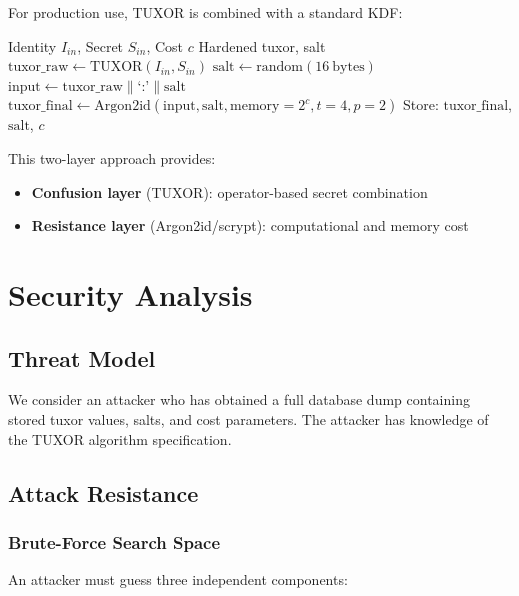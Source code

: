 \documentclass[11pt,a4paper]{article}
\begin{document}
For production use, TUXOR is combined with a standard KDF:

\begin{algorithm}
\caption{TUXOR Secure Mode}
\label{alg:secure}
\begin{algorithmic}[1]
\Require Identity $I_{in}$, Secret $S_{in}$, Cost $c$
\Ensure Hardened tuxor, salt
\State $\text{tuxor\_raw} \gets \text{TUXOR}(I_{in}, S_{in})$ 
\State $\text{salt} \gets \text{random}(16\ \text{bytes})$
\State $\text{input} \gets \text{tuxor\_raw} \| \text{`:'} \| \text{salt}$
\State $\text{tuxor\_final} \gets \text{Argon2id}(\text{input}, \text{salt}, \text{memory}=2^c, t=4, p=2)$
\State Store: $\text{tuxor\_final}$, $\text{salt}$, $c$
\end{algorithmic}
\end{algorithm}

This two-layer approach provides:
\begin{itemize}[noitemsep]
  \item \textbf{Confusion layer} (TUXOR): operator-based secret combination
  \item \textbf{Resistance layer} (Argon2id/scrypt): computational and memory cost
\end{itemize}

\section{Security Analysis}

\subsection{Threat Model}

We consider an attacker who has obtained a full database dump containing stored tuxor values, salts, and cost parameters. The attacker has knowledge of the TUXOR algorithm specification.

\subsection{Attack Resistance}

\subsubsection{Brute-Force Search Space}

An attacker must guess three independent components:
\end{document}
